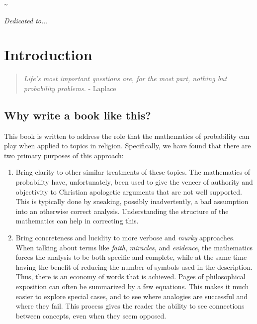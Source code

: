 \documentclass{tufte-book}
\begin{document}
\cleardoublepage
\textasciitilde{}\vfill

\begin{doublespace}
\noindent\fontsize{18}{22}\selectfont\itshape
\nohyphenation
Dedicated to...
\end{doublespace}

\thispagestyle{empty} \vfill
\vfill

\cleardoublepage

\tableofcontents

\mainmatter

\chapter{Introduction}\label{introduction}

\begin{quote}
\emph{Life's most important questions are, for the most part, nothing
but probability problems.} - Laplace
\end{quote}

\section{Why write a book like this?}\label{why-write-a-book-like-this}

This book is written to address the role that the mathematics of
probability can play when applied to topics in religion. Specifically,
we have found that there are two primary purposes of this approach:

\begin{enumerate}
\def\labelenumi{\arabic{enumi}.}
\itemsep1pt\parskip0pt
\item
  Bring clarity to other similar treatments of these topics. The
  mathematics of probability have, unfortunately, been used to give the
  veneer of authority and objectivity to Christian apologetic arguments
  that are not well supported\citep{swinburne2003resurrection}. This is
  typically done by sneaking, possibly inadvertently, a bad assumption
  into an otherwise correct analysis. Understanding the structure of the
  mathematics can help in correcting this.
\item
  Bring concreteness and lucidity to more verbose and \emph{murky}
  approaches. When talking about terms like \emph{faith},
  \emph{miracles}, and \emph{evidence}, the mathematics forces the
  analysis to be both specific and complete, while at the same time
  having the benefit of reducing the number of symbols used in the
  description. Thus, there is an economy of words that is achieved.
  Pages of philosophical exposition can often be summarized by a few
  equations\citep{howard2013propositional}. This makes it much easier to
  explore special cases, and to see where analogies are successful and
  where they fail. This process gives the reader the ability to see
  connections between concepts, even when they seem opposed.
\end{enumerate}
\end{document}
